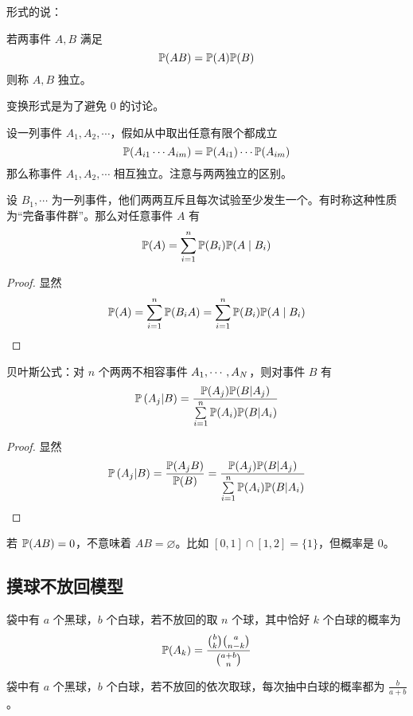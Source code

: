 形式的说：

\begin{definition}[条件概率]
	若两事件 $A, B$ 满足
	\[ \mathbb{P}(A B) = \mathbb{P}(A) \mathbb{P}(B) \]
	则称 $A, B$ 独立。
\end{definition}

变换形式是为了避免 $0$ 的讨论。

设一列事件 $A_1, A_2, \cdots$，假如从中取出任意有限个都成立
\[ \mathbb{P}(A_{i1} \cdots A_{im}) = \mathbb{P}(A_{i1}) \cdots \mathbb{P}(A_{im}) \]
那么称事件 $A_1, A_2, \cdots$ 相互独立。注意与两两独立的区别。


\begin{theorem}[全概率公式]
	设 $B_1, \cdots$ 为一列事件，他们两两互斥且每次试验至少发生一个。有时称这种性质为“完备事件群”。那么对任意事件 $A$ 有
	\[ \mathbb{P}(A) = \sum_{i=1}^n \mathbb{P}(B_i)\mathbb{P}(A \mid B_i) \]
\end{theorem}

\begin{proof}
	显然
	\[ \mathbb{P}(A) = \sum_{i=1}^n \mathbb{P}(B_i A) = \sum_{i=1}^n \mathbb{P}(B_i)\mathbb{P}(A \mid B_i) \]
\end{proof}


\begin{theorem}[全概率公式]
	贝叶斯公式：对 $n$ 个两两不相容事件 $A_1,\cdots,A_N$，则对事件 $B$ 有
	\[ \mathbb{P}\left(A_j | B\right) = \frac{\mathbb{P}(A_j)\mathbb{P}(B | A_j)}{\sum\limits_{i=1}^n \mathbb{P}(A_i)\mathbb{P}(B | A_i) } \]
\end{theorem}

\begin{proof}
	显然
	\[ \mathbb{P}\left(A_j | B\right) = \frac{\mathbb{P}(A_j B)}{\mathbb{P}(B)} = \frac{\mathbb{P}(A_j)\mathbb{P}(B | A_j)}{\sum\limits_{i=1}^n \mathbb{P}(A_i)\mathbb{P}(B | A_i) } \]
\end{proof}

\begin{note}
	若 $\mathbb{P}(AB) = 0$，不意味着 $AB = \varnothing$。比如 $[0,1]\cap [1,2] = \{1\}$，但概率是 $0$。
\end{note}

\subsection{摸球不放回模型}

袋中有 $a$ 个黑球，$b$ 个白球，若不放回的取 $n$ 个球，其中恰好 $k$ 个白球的概率为
\[ \mathbb{P}(A_k) = \frac{\binom{b}{k} \binom{a}{n-k}}{\binom{a+b}{n}} \]

\begin{theorem}[抽签原理]
	袋中有 $a$ 个黑球，$b$ 个白球，若不放回的依次取球，每次抽中白球的概率都为 $\frac{b}{a+b}$。
\end{theorem}

